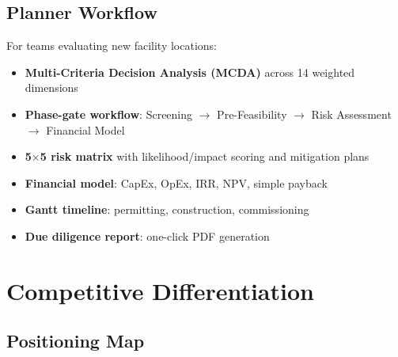 \documentclass[11pt, a4paper]{article}
\begin{document}
\subsection{Planner Workflow}

For teams evaluating new facility locations:

\begin{itemize}[leftmargin=1.4em]
  \item \textbf{Multi-Criteria Decision Analysis (MCDA)} across 14 weighted dimensions
  \item \textbf{Phase-gate workflow}: Screening $\rightarrow$ Pre-Feasibility $\rightarrow$ Risk Assessment $\rightarrow$ Financial Model
  \item \textbf{5$\times$5 risk matrix} with likelihood/impact scoring and mitigation plans
  \item \textbf{Financial model}: CapEx, OpEx, IRR, NPV, simple payback
  \item \textbf{Gantt timeline}: permitting, construction, commissioning
  \item \textbf{Due diligence report}: one-click PDF generation
\end{itemize}

\section{Competitive Differentiation}

\subsection{Positioning Map}
\end{document}
